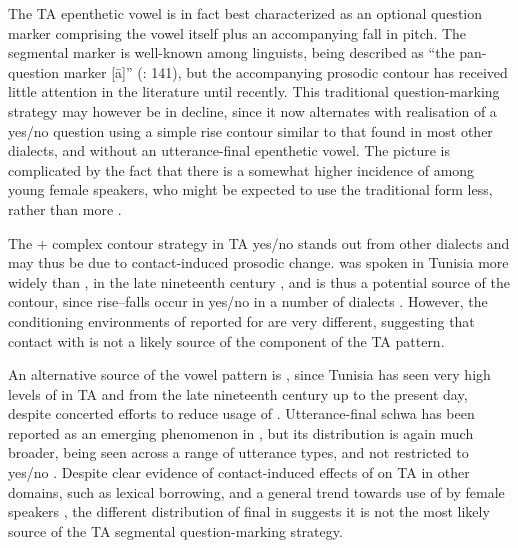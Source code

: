 \documentclass[output=paper]{langsci/langscibook}
\begin{document}
The TA epenthetic vowel is in fact best characterized as an optional question marker comprising the vowel itself plus an accompanying fall in pitch. The segmental marker is well-known among  linguists, being described as “the pan- question marker  [ā]” (\citealt{HerinZammit2017}: 141), but the accompanying prosodic contour has received little attention in the literature until recently. This traditional question-marking strategy may however be in decline, since it now alternates with realisation of a yes/no question using a simple rise contour similar to that found in most other  dialects, and without an utterance-final epenthetic vowel. The picture is complicated by the fact that there is a somewhat higher incidence of  among young female speakers, who might be expected to use the traditional form less, rather than more \citep{Hellmuthforthcomingtunisianyesno}. 

The  + complex contour strategy in TA yes/no  stands out from other  dialects and may thus be due to contact-induced prosodic change.  was spoken in Tunisia more widely than , in the late nineteenth century \citep{Sayahi2011}, and is thus a potential source of the contour, since rise--falls occur in yes/no  in a number of  dialects \citep{GiliFivelaEtAl2015}. However, the conditioning environments of  reported for   are very different, suggesting that contact with  is not a likely source of the  component of the TA pattern.

An alternative source of the vowel  pattern is , since Tunisia has seen very high levels of  in TA and  from the late nineteenth century up to the present day, despite concerted efforts to reduce usage of  \citep{Daoud2007}. Utterance-final schwa  has been reported as an emerging phenomenon in  \citep{Hansen1997}, but its distribution is again much broader, being seen across a range of utterance types, and not restricted to yes/no . Despite clear evidence of contact-induced effects of  on TA in other domains, such as lexical borrowing, and a general trend towards use of  by female speakers \citep{Walters2011}, the different distribution of final  in  suggests it is not the most likely source of the TA segmental question-marking strategy. 
\end{document}
